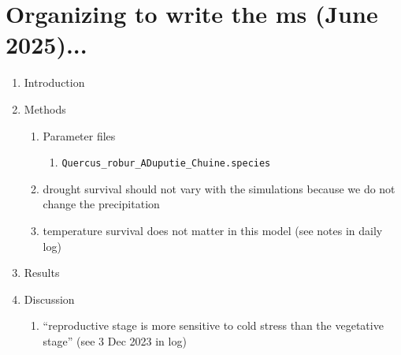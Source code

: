\documentclass[11pt,letter]{article}
\begin{document}
\newpage
\section{Organizing to write the ms (June 2025)... }

\begin{enumerate}
\item Introduction
\item Methods
\begin{enumerate}
\item Parameter files
\begin{enumerate}
\item  \verb|Quercus_robur_ADuputie_Chuine.species|
\end{enumerate}
\item drought survival should not vary with the simulations because we do not change the precipitation
\item temperature survival does not matter in this model (see notes in daily log)
\end{enumerate}
\item Results
\item Discussion
\begin{enumerate}
\item ``reproductive stage is more sensitive to cold stress than the vegetative stage'' (see 3 Dec 2023 in log)
\end{enumerate}
\end{enumerate}
\end{document}
